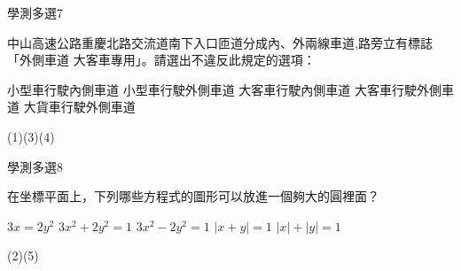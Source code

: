     \begin{QUESTION}
        \begin{ExamInfo}{93}{學測}{多選}{7}
        \end{ExamInfo}
        \begin{ExamAnsRateInfo}{56}{77}{61}{30}
        \end{ExamAnsRateInfo}
        \begin{QBODY}
            中山高速公路重慶北路交流道南下入口匝道分成內、外兩線車道,路旁立有標誌 「外側車道 大客車專用」。請選出不違反此規定的選項：
            \begin{QOPS}
                \QOP 小型車行駛內側車道 
                \QOP 小型車行駛外側車道 
                \QOP 大客車行駛內側車道 
                \QOP 大客車行駛外側車道 
                \QOP 大貨車行駛外側車道
            \end{QOPS}
        \end{QBODY}
        \begin{QFROMS}
        \end{QFROMS}
        \begin{QTAGS}\end{QTAGS}
        \begin{QANS}
            (1)(3)(4)
        \end{QANS}
        \begin{QSOLLIST}
        \end{QSOLLIST}
        \begin{QEMPTYSPACE}
        \end{QEMPTYSPACE}
    \end{QUESTION}
    \begin{QUESTION}
        \begin{ExamInfo}{93}{學測}{多選}{8}
        \end{ExamInfo}
        \begin{ExamAnsRateInfo}{43}{77}{39}{13}
        \end{ExamAnsRateInfo}
        \begin{QBODY}
            在坐標平面上，下列哪些方程式的圖形可以放進一個夠大的圓裡面？ 
            \begin{QOPS} 
                \QOP $3x=2y^2$ 
                \QOP $3x^2+2y^2=1$ 
                \QOP $3x^2-2y^2=1$ \QOP $|x+y|=1$ 
                \QOP $|x|+|y|=1$
            \end{QOPS}
        \end{QBODY}
        \begin{QFROMS}
        \end{QFROMS}
        \begin{QTAGS}\end{QTAGS}
        \begin{QANS}
            (2)(5)
        \end{QANS}
        \begin{QSOLLIST}
        \end{QSOLLIST}
        \begin{QEMPTYSPACE}
        \end{QEMPTYSPACE}
    \end{QUESTION}
